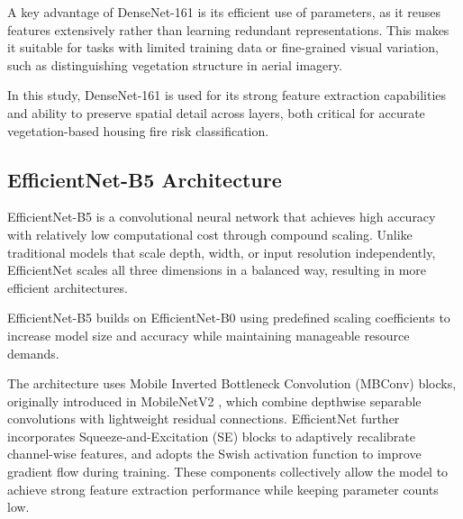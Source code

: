 A key advantage of DenseNet-161 is its efficient use of parameters, as it reuses 
features extensively rather than learning redundant representations. This makes it 
suitable for tasks with limited training data or fine-grained visual variation, 
such as distinguishing vegetation structure in aerial imagery.

In this study, DenseNet-161 is used for its strong feature extraction capabilities 
and ability to preserve spatial detail across layers, both critical for accurate 
vegetation-based housing fire risk classification.


\subsection{EfficientNet-B5 Architecture}

EfficientNet-B5 \cite{efficientnet} is a convolutional neural network that 
achieves high accuracy with relatively low computational cost through compound 
scaling. Unlike traditional models that scale depth, width, or input resolution 
independently, EfficientNet scales all three dimensions in a balanced way, 
resulting in more efficient architectures.

EfficientNet-B5 builds on EfficientNet-B0 using predefined scaling coefficients 
to increase model size and accuracy while maintaining manageable resource demands.

The architecture uses Mobile Inverted Bottleneck Convolution (MBConv) blocks, 
originally introduced in MobileNetV2 \cite{mobilenetv2}, which 
combine depthwise separable convolutions with lightweight residual connections. 
EfficientNet further incorporates Squeeze-and-Excitation (SE) blocks \cite{hu2018squeeze} to 
adaptively recalibrate channel-wise features, and adopts the Swish activation function 
\cite{ramachandran2017searching} to improve gradient flow during training. These components 
collectively allow the model to achieve strong feature extraction performance while keeping parameter counts low.


